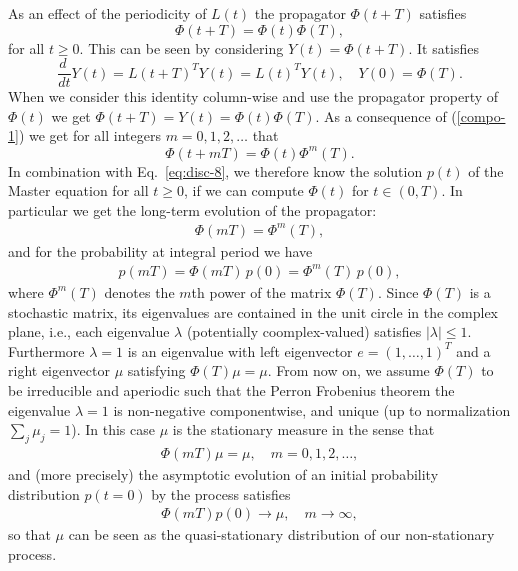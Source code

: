 \documentclass[aps, pre, preprint,unsortedaddress,a4paper,onecolumn]{revtex4}
\newcommand{\vect}[1]{#1}
\newcommand{\myphi}{\Phi}
\newcommand{\mymu}{\mu}
\begin{document}
As an effect of the periodicity of $\vect L(t)$ the propagator $\myphi(t+T)$
satisfies
\begin{equation}\label{compo-1}
\myphi(t+T)=\myphi(t)\myphi(T),
\end{equation}
for all $t\ge 0$. This can be seen by considering $\vect Y(t)=\myphi(t+T)$. It satisfies
\[
\frac{d\ }{dt}\vect Y(t)=\vect L(t+T)^T \vect Y(t)=\vect L(t)^T\vect Y(t),\quad \vect Y(0)=\myphi(T).
\]
When we consider this identity column-wise and use the propagator property of $\myphi(t)$ we get $\myphi(t+T)=\vect Y(t)=\myphi(t)\myphi(T)$. As a consequence of (\ref{compo-1}) we get for all integers $m=0,1,2,\ldots$ that 
\begin{equation}\label{compo-2}
\myphi(t+mT)=\myphi(t)\myphi^m(T).
\end{equation}
In combination with Eq.~\eqref{eq:disc-8}, we therefore
know the solution $\vect p(t)$ of the Master equation for all $t\ge 0$,
if we can compute $\myphi(t)$ for $t\in (0,T)$.  
In particular we get the long-term evolution of the propagator:
\begin{align}
\label{eq:floq-13}  
\myphi(mT)=\myphi^m(T),
\end{align}
and for the probability at integral period we have
\begin{align}
  \label{eq:floq-dynamics}
  p(mT) =  \myphi(mT)\, p(0) = \myphi^m(T)\, p(0),
\end{align}
where $\myphi^m(T)$ denotes the $m$th power of the matrix $\myphi(T)$.
Since $\myphi(T)$ is a stochastic matrix, its eigenvalues are contained in the unit circle in
the complex plane, i.e., each eigenvalue $\lambda$ (potentially coomplex-valued)
satisfies $|\lambda|\le 1$. Furthermore $\lambda=1$ is an
eigenvalue with left eigenvector $\vect e=(1,\ldots,1)^T$ and a right eigenvector $\mymu$
satisfying
$\myphi(T)\mymu=\mymu$.
From now on, we assume $\myphi(T)$ to be irreducible and aperiodic such that the Perron Frobenius theorem the eigenvalue $\lambda=1$ is  non-negative componentwise, and unique (up to normalization $\sum_j\mu_j=1$). In this case $\mymu$ is the stationary measure in the sense that
\begin{align}
\label{eq:floq-14}  
\myphi(mT) \mymu = \mymu,\quad m=0,1,2,\ldots,
\end{align}
and (more precisely) the asymptotic evolution of an initial probability distribution $\vect p(t=0)$ by the process satisfies
\begin{align}
\label{eq:floq-15}  
\myphi(mT)\vect p(0)\to \mymu,\quad m\to\infty,
\end{align}
so that $\mymu$ can be seen as the quasi-stationary distribution of our non-stationary process.
\end{document}
